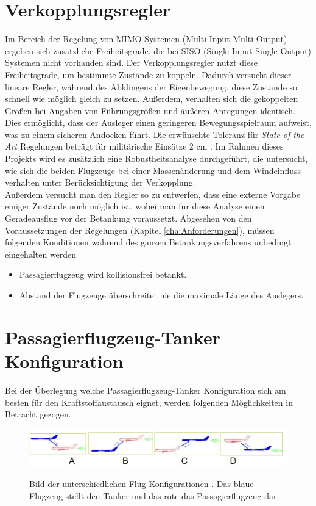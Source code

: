 \section*{ Verkopplungsregler}
Im Bereich der Regelung von MIMO Systemen (Multi Input Multi Output) ergeben sich zusätzliche Freiheitsgrade, die bei SISO (Single Input Single Output) Systemen nicht vorhanden sind. Der Verkopplungsregler nutzt diese Freiheitsgrade, um bestimmte Zustände zu koppeln. Dadurch versucht dieser lineare Regler, während des Abklingens der Eigenbewegung, diese Zustände so schnell wie möglich gleich zu setzen. Außerdem, verhalten sich die gekoppelten Größen bei Angaben von Führungsgrößen und äußeren Anregungen identisch. Dies ermöglicht, dass der Ausleger einen geringeren Bewegungsspielraum aufweist, was zu einem sicheren Andocken führt. Die erwünschte Toleranz für \textit{State of the Art} Regelungen beträgt für militärische Einsätze $2$ cm \cite{Autonom1}.  Im Rahmen dieses Projekts wird es zusätzlich eine Robustheitsanalyse durchgeführt, die untersucht, wie sich die beiden Flugzeuge bei einer Massenänderung und dem Windeinfluss verhalten unter Berücksichtigung der Verkopplung.\\
Außerdem versucht man den Regler so zu entwerfen, dass eine externe Vorgabe einiger Zustände noch möglich ist, wobei man für diese Analyse einen Geradeausflug vor der Betankung voraussetzt. Abgesehen von den Voraussetzungen der Regelungen (Kapitel \ref{cha:Anforderungen}), müssen folgenden Konditionen während des ganzen Betankungsverfahrens unbedingt eingehalten werden
\begin{itemize}
    \item Passagierflugzeug wird kollisionsfrei betankt.
    \item Abstand der Flugzeuge überschreitet nie die maximale Länge des Auslegers. 
    
\end{itemize}
\section{Passagierflugzeug-Tanker Konfiguration}
Bei der Überlegung welche Passagierflugzeug-Tanker Konfiguration sich am besten für den Kraftstoffaustausch eignet, werden folgenden Möglichkeiten in Betracht gezogen.
\begin{figure}[h]
\centering 
\includegraphics[scale=0.6]{./Bilder/Konfiguration.jpg}
\label{fig:Konfigurationen}
\caption{Bild der unterschiedlichen Flug Konfigurationen \cite{RefuelingTime}. Das blaue Flugzeug stellt den Tanker und das rote das Passagierflugzeug dar.}
\end{figure}

